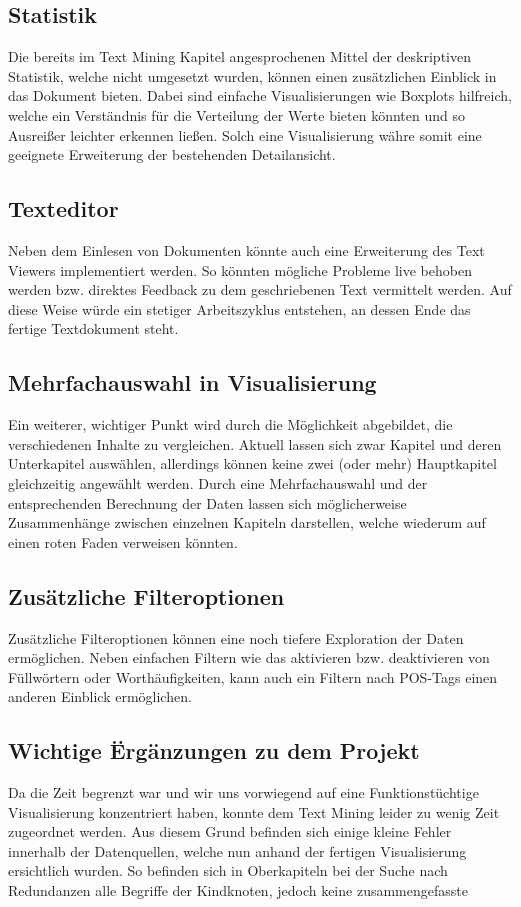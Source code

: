 \subsection*{Statistik}
Die bereits im Text Mining Kapitel angesprochenen Mittel der deskriptiven Statistik, welche nicht umgesetzt wurden, k\"onnen einen zus\"atzlichen Einblick in das Dokument bieten. Dabei sind einfache Visualisierungen wie Boxplots hilfreich, welche ein Verst\"andnis f\"ur die Verteilung der Werte bieten k\"onnten und so Ausreißer leichter erkennen ließen. Solch eine Visualisierung w\"ahre somit eine geeignete Erweiterung der bestehenden Detailansicht.

\subsection*{Texteditor}
Neben dem Einlesen von Dokumenten k\"onnte auch eine Erweiterung des Text Viewers implementiert werden. So k\"onnten m\"ogliche Probleme live behoben werden bzw. direktes Feedback zu dem geschriebenen Text vermittelt werden. Auf diese Weise w\"urde ein stetiger Arbeitszyklus entstehen, an dessen Ende das fertige Textdokument steht. 

\subsection*{Mehrfachauswahl in Visualisierung}
Ein weiterer, wichtiger Punkt wird durch die M\"oglichkeit abgebildet, die verschiedenen Inhalte zu vergleichen. Aktuell lassen sich zwar Kapitel und deren Unterkapitel ausw\"ahlen, allerdings k\"onnen keine zwei (oder mehr) Hauptkapitel gleichzeitig angewählt werden. Durch eine Mehrfachauswahl und der entsprechenden Berechnung der Daten lassen sich m\"oglicherweise Zusammenh\"ange zwischen einzelnen Kapiteln darstellen, welche wiederum auf einen roten Faden verweisen k\"onnten.

\subsection*{Zusätzliche Filteroptionen}
Zus\"atzliche Filteroptionen k\"onnen eine noch tiefere Exploration der Daten erm\"oglichen. Neben einfachen Filtern wie das aktivieren bzw. deaktivieren von F\"ullw\"ortern oder Worth\"aufigkeiten, kann auch ein Filtern nach POS-Tags einen anderen Einblick erm\"oglichen.

\subsection*{Wichtige \"Erg\"anzungen zu dem Projekt}
Da die Zeit begrenzt war und wir uns vorwiegend auf eine Funktionst\"uchtige Visualisierung konzentriert haben, konnte dem Text Mining leider zu wenig Zeit zugeordnet werden. Aus diesem Grund befinden sich einige kleine Fehler innerhalb der Datenquellen, welche nun anhand der fertigen Visualisierung ersichtlich wurden. So befinden sich in Oberkapiteln bei der Suche nach Redundanzen alle Begriffe der Kindknoten, jedoch keine zusammengefasste